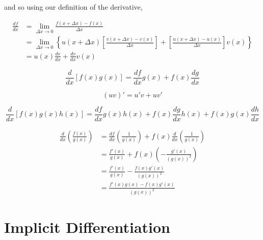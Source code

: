 and so using our definition of the derivative,

\begin{align*}
    \frac{df}{dx} &= \lim_{\Delta x \to 0} \frac{f(x + \Delta x) - f(x)}{\Delta x}\\
    &= \lim_{\Delta x \to 0} \left\{u(x + \Delta x)\left[\frac{v(x + \Delta x) - v(x)}{\Delta x}\right] + \left[\frac{u(x + \Delta x) - u(x)}{\Delta x}\right]v(x)\right\}\\
    &= u(x)\frac{dv}{dx} + \frac{dv}{dx}v(x)
\end{align*}

\begin{equation*}
    \frac{d}{dx} \left[f(x)g(x)\right] = \frac{df}{dx} g(x) + f(x)\frac{dg}{dx}
\end{equation*}

\begin{equation*}
    (uv)' = u' v + uv'
\end{equation*}

\begin{equation*}
    \frac{d}{dx} \left[f(x)g(x)h(x)\right] = \frac{df}{dx} g(x)h(x) + f(x)\frac{dg}{dx} h(x) + f(x)g(x) \frac{dh}{dx}
\end{equation*}

\begin{align*}
    \frac{d}{dx}\left(\frac{f(x)}{g(x)}\right) &= \frac{df}{dx}\left(\frac{1}{g(x)}\right) + f(x)\frac{d}{dx}\left(\frac{1}{g(x)}\right)\\
    &= \frac{f'(x)}{g(x)} + f(x)\left(- \frac{g'(x)}{(g(x))^2}\right)\\
    &= \frac{f'(x)}{g(x)} - \frac{f(x)g'(x)}{(g(x))^{2}}\\
    &= \frac{f'(x)g(x) - f(x)g'(x)}{(g(x))^{2}}
\end{align*}

\section{Implicit Differentiation}
